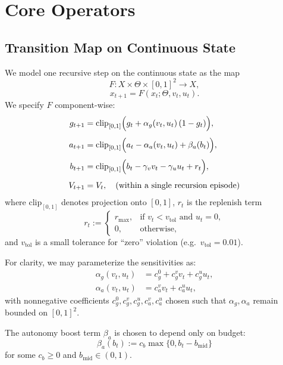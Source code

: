 \documentclass[11pt]{article}
\begin{document}
\section{Core Operators}

\subsection{Transition Map on Continuous State}

We model one recursive step on the continuous state as the map
\[
  F: X \times \Theta \times [0,1]^2 \to X,
\]
\[
  x_{t+1} = F(x_t; \Theta, v_t, u_t).
\]
We specify $F$ component-wise:
\begin{align}
  g_{t+1}
    &= \mathrm{clip}_{[0,1]}\Bigl(
         g_t + \alpha_g(v_t, u_t)\,(1 - g_t)
       \Bigr),
       \label{eq:g-update}\\[4pt]
  a_{t+1}
    &= \mathrm{clip}_{[0,1]}\Bigl(
         a_t - \alpha_a(v_t, u_t) + \beta_a(b_t)
       \Bigr),
       \label{eq:a-update}\\[4pt]
  b_{t+1}
    &= \mathrm{clip}_{[0,1]}\Bigl(
         b_t - \gamma_v v_t - \gamma_u u_t + r_t
       \Bigr),
       \label{eq:b-update}\\[4pt]
  V_{t+1}
    &= V_t, \quad \text{(within a single recursion episode)}
       \label{eq:V-update-episode}
\end{align}
where $\mathrm{clip}_{[0,1]}$ denotes projection onto $[0,1]$, $r_t$ is the replenish term
\[
  r_t :=
  \begin{cases}
    r_{\max}, & \text{if } v_t < v_{\mathrm{tol}} \text{ and } u_t = 0,\\
    0, & \text{otherwise},
  \end{cases}
\]
and $v_{\mathrm{tol}}$ is a small tolerance for ``zero'' violation (e.g.\ $v_{\mathrm{tol}} = 0.01$).

For clarity, we may parameterize the sensitivities as:
\begin{align}
  \alpha_g(v_t,u_t)
    &= c_g^0 + c_g^v v_t + c_g^u u_t, \label{eq:alpha-g}\\
  \alpha_a(v_t,u_t)
    &= c_a^v v_t + c_a^u u_t, \label{eq:alpha-a}
\end{align}
with nonnegative coefficients $c_g^0, c_g^v, c_g^u, c_a^v, c_a^u$ chosen such that $\alpha_g,\alpha_a$ remain bounded on $[0,1]^2$.

The autonomy boost term $\beta_a$ is chosen to depend only on budget:
\[
  \beta_a(b_t) := c_b \max\{0, b_t - b_{\mathrm{mid}}\}
\]
for some $c_b \ge 0$ and $b_{\mathrm{mid}} \in (0,1)$.
\end{document}
